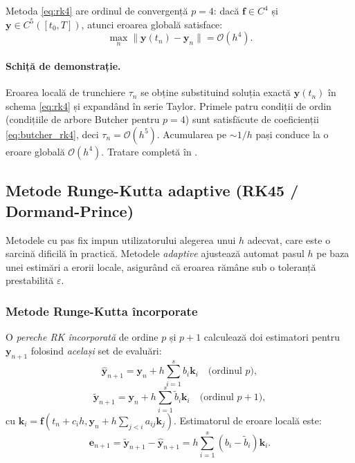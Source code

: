 \begin{teorema}
\label{thm:rk4_ordin}
Metoda \eqref{eq:rk4} are ordinul de convergență $p = 4$: dacă
$\mathbf{f} \in C^4$ și $\mathbf{y} \in C^5([t_0, T])$, atunci eroarea globală
satisface:
\begin{equation}
    \max_{n} \|\mathbf{y}(t_n) - \mathbf{y}_n\| = \mathcal{O}(h^4).
\end{equation}
\end{teorema}

\paragraph{Schiță de demonstrație.}
Eroarea locală de trunchiere $\tau_n$ se obține substituind soluția exactă
$\mathbf{y}(t_n)$ în schema \eqref{eq:rk4} și expandând în serie Taylor.
Primele patru condiții de ordin (condițiile de arbore Butcher pentru
$p = 4$) sunt satisfăcute de coeficienții \eqref{eq:butcher_rk4}, deci
$\tau_n = \mathcal{O}(h^5)$. Acumularea pe $\sim 1/h$ pași conduce la o
eroare globală $\mathcal{O}(h^4)$. Tratare completă în \cite{hairer1993}.

\subsection{Metode Runge-Kutta adaptive (RK45 / Dormand-Prince)}
\label{subsec:rk_adaptive}

Metodele cu pas fix impun utilizatorului alegerea unui $h$ adecvat, care este
o sarcină dificilă în practică. Metodele \emph{adaptive} ajustează automat
pasul $h$ pe baza unei estimări a erorii locale, asigurând că eroarea rămâne
sub o toleranță prestabilită $\varepsilon$.

\subsubsection{Metode Runge-Kutta încorporate}

O \emph{pereche RK încorporată} de ordine $p$ și $p+1$ calculează doi
estimatori pentru $\mathbf{y}_{n+1}$ folosind \emph{același} set de evaluări:
\begin{equation}
    \hat{\mathbf{y}}_{n+1} = \mathbf{y}_n + h\sum_{i=1}^s b_i \mathbf{k}_i \quad \text{(ordinul } p\text{)},
\end{equation}
\begin{equation}
    \tilde{\mathbf{y}}_{n+1} = \mathbf{y}_n + h\sum_{i=1}^s \tilde{b}_i \mathbf{k}_i \quad \text{(ordinul } p+1\text{)},
\end{equation}
cu $\mathbf{k}_i = \mathbf{f}(t_n + c_i h, \mathbf{y}_n + h\sum_{j<i} a_{ij} \mathbf{k}_j)$.
Estimatorul de eroare locală este:
\begin{equation}
    \mathbf{e}_{n+1} = \tilde{\mathbf{y}}_{n+1} - \hat{\mathbf{y}}_{n+1} = h\sum_{i=1}^s (b_i - \tilde{b}_i)\mathbf{k}_i.
\end{equation}

